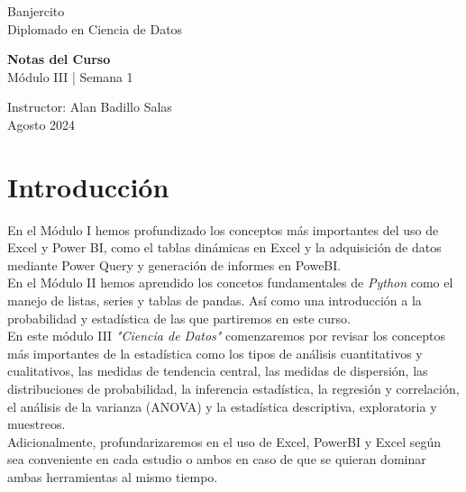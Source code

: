 \documentclass{article}
\begin{document}
\begin{center}
    \Large Banjercito \\[24pt]
    \Large Diplomado en Ciencia de Datos
\end{center}

\vfill

\begin{flushleft}
    \LARGE \textbf{Notas del Curso} \\[12pt]
    \LARGE Módulo III | Semana 1 \\[24pt]
\end{flushleft}

\vfil

\begin{flushleft}
    Instructor: Alan Badillo Salas \\[12pt]
    Agosto 2024 \\[24pt]
\end{flushleft}

\vfill

\section{Introducción}

En el Módulo I hemos profundizado los conceptos más importantes del uso de Excel y Power BI, como el tablas dinámicas en Excel y la adquisición de datos mediante Power Query y generación de informes en PoweBI.
\\[12pt]
En el Módulo II hemos aprendido los concetos fundamentales de \textit{Python} como el manejo de listas, series y tablas de pandas. Así como una introducción a la probabilidad y estadística de las que partiremos en este curso.
\\[12pt]
En este módulo III \textit{"Ciencia de Datos"} comenzaremos por revisar los conceptos más importantes de la estadística como los tipos de análisis cuantitativos y cualitativos, las medidas de tendencia central, las medidas de dispersión, las distribuciones de probabilidad, la inferencia estadística, la regresión y correlación, el análisis de la varianza (ANOVA) y la estadística descriptiva, exploratoria y muestreos.
\\[12pt]
Adicionalmente, profundarizaremos en el uso de Excel, PowerBI y Excel según sea conveniente en cada estudio o ambos en caso de que se quieran dominar ambas herramientas al mismo tiempo.

\clearpage


\end{document}
